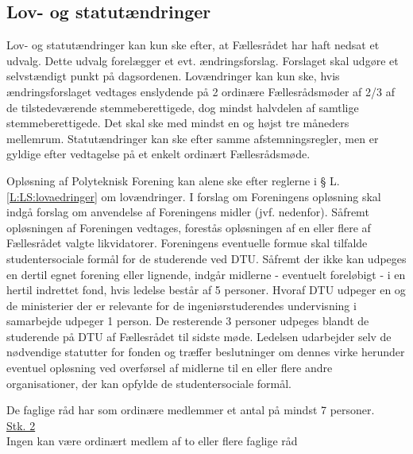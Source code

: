 \begin{list}


\subsection{Lov- og statutændringer}
\item \label{L:LS:lovaedringer} Lov- og statutændringer kan kun ske efter, at Fællesrådet har haft nedsat et udvalg. Dette udvalg forelægger et evt. ændringsforslag. Forslaget skal udgøre et selvstændigt punkt på dagsordenen. Lovændringer kan kun ske, hvis ændringsforslaget vedtages enslydende på 2 ordinære Fællesrådsmøder af 2/3 af de tilstedeværende stemmeberettigede, dog mindst halvdelen af samtlige stemmeberettigede. Det skal ske med mindst en og højst tre måneders mellemrum. Statutændringer kan ske efter samme afstemningsregler, men er gyldige efter vedtagelse på et enkelt ordinært Fællesrådsmøde.

\item \label{L:LS:oploesning} Opløsning af Polyteknisk Forening kan alene ske efter reglerne i § L.\ref{L:LS:lovaedringer} om lovændringer. I forslag om Foreningens opløsning skal indgå forslag om anvendelse af Foreningens midler (jvf. nedenfor). Såfremt opløsningen af Foreningen vedtages, forestås opløsningen af en eller flere af Fællesrådet valgte likvidatorer. Foreningens eventuelle formue skal tilfalde studentersociale formål for de studerende ved DTU. Såfremt der ikke kan udpeges en dertil egnet forening eller lignende, indgår midlerne - eventuelt foreløbigt - i en hertil indrettet fond, hvis ledelse består af 5 personer. Hvoraf DTU udpeger en og de ministerier der er relevante for de ingeniørstuderendes undervisning i samarbejde udpeger 1 person. De resterende 3 personer udpeges blandt de studerende på DTU af Fællesrådet til sidste møde. Ledelsen udarbejder selv de nødvendige statutter for fonden og træffer beslutninger om dennes virke herunder eventuel opløsning ved overførsel af midlerne til en eller flere andre organisationer, der kan opfylde de studentersociale formål.

\item De faglige råd har som ordinære medlemmer et antal på mindst 7 personer.\\

\underline{Stk. 2} \\
Ingen kan være ordinært medlem af to eller flere faglige råd\\


\end{list}
